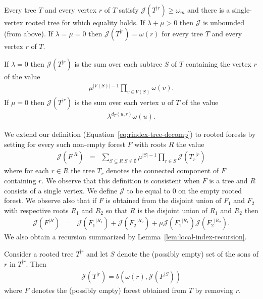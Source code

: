 \documentclass[11 pt]{modarticle}
\newcommand{\wmap}{\omega}
\newcommand{\wmin}{\omega_m}
\newcommand{\size}[1]{|#1|}
\newcommand{\vsetof}[1]{V(#1)}
\newcommand{\distance}[3]{d_{#3}(#1,#2)}
\newcommand{\rtree}[2]{{#1}^{\lvert #2}}
\newcommand{\bilinear}{b}
\newcommand{\rindexsymbol}{\mathcal{J}}
\newcommand{\rindex}[2]{\rindexsymbol(\rtree{#2}{#1})}
\begin{document}
\begin{rem}\label{rem:rindex-minimum-value}
Every tree $T$ and every vertex $r$ of $T$ satisfy $\rindex{r}{T} \geq \wmin$ and there is a single-vertex rooted tree for which equality holds. If $\lambda + \mu > 0$ then $\rindexsymbol$ is unbounded (from above). If $\lambda = \mu = 0$ then $\rindex{r}{T} = \wmap(r)$ for every tree $T$ and every vertex $r$ of $T$.
\end{rem}

\begin{rem}\label{rem:rooted-examples}
If $\lambda = 0$ then $\rindex{r}{T}$ is the sum over each subtree $S$ of $T$ containing the vertex $r$ of the value
\begin{eqnarray*}
	\mu^{\size{\vsetof{S}}-1} \underset{v \in \vsetof{S}}{\prod} \wmap(v).
\end{eqnarray*}
If $\mu = 0$ then $\rindex{r}{T}$ is the sum over each vertex $u$ of $T$ of the value
\begin{eqnarray*}
	\lambda^{\distance{u}{r}{T}} \wmap(u).
\end{eqnarray*}
\end{rem}

We extend our definition (Equation~\eqref{eq:rindex-tree-decomp}) to rooted forests by setting for every such non-empty forest $F$ with roots $R$ the value
\begin{eqnarray*}
	\rindex{R}{F} & = & \underset{S \subseteq R \; S \neq \emptyset}{\sum} \mu^{\size{S} - 1} \underset{r \in S}{\prod} \rindex{r}{T_r}
\end{eqnarray*}
where for each $r \in R$ the tree $T_r$ denotes the connected component of $F$ containing $r$. We observe that this definition is consistent when $F$ is a tree and $R$ consists of a single vertex. We define $\rindexsymbol$ to be equal to $0$ on the empty rooted forest. We observe also that if $F$ is obtained from the disjoint union of $F_1$ and $F_2$ with respective roots $R_1$ and $R_2$ so that $R$ is the disjoint union of $R_1$ and $R_2$ then
\begin{eqnarray}
	\rindex{R}{F} & = & \rindex{R_1}{F_1} + \rindex{R_2}{F_2} + \mu \rindex{R_1}{F_1} \rindex{R_2}{F_2}. \label{eq:rindex-forest-decomp}
\end{eqnarray}
We also obtain a recursion summarized by Lemma~\ref{lem:local-index-recursion}.

\begin{lem}\label{lem:local-index-recursion}
	Consider a rooted tree $\rtree{T}{r}$ and let $S$ denote the (possibly empty) set of the sons of $r$ in $\rtree{T}{r}$. Then
\begin{eqnarray*}
	\rindex{r}{T} = \bilinear(\wmap(r), \rindex{S}{F})
\end{eqnarray*}
where $F$ denotes the (possibly empty) forest obtained from $T$ by removing $r$.
\end{lem}
\end{document}
